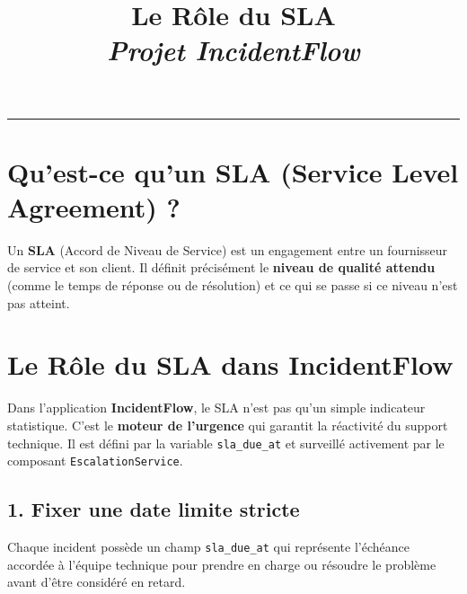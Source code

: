 \documentclass[12pt,a4paper]{article}
\title{\textbf{\Huge Le Rôle du SLA}\\ \large \vspace{0.5cm} \textit{Projet IncidentFlow}}
\author{}
\date{}
\begin{document}
\maketitle
\vspace{-1.5cm}
\hrule
\vspace{1cm}

\section*{Qu'est-ce qu'un SLA (Service Level Agreement) ?}
Un \textbf{SLA} (Accord de Niveau de Service) est un engagement entre un fournisseur de service et son client. Il définit précisément le \textbf{niveau de qualité attendu} (comme le temps de réponse ou de résolution) et ce qui se passe si ce niveau n'est pas atteint.

\vspace{0.5cm}
\noindent{}

\vspace{1cm}

\section*{Le Rôle du SLA dans IncidentFlow}
Dans l'application \textbf{IncidentFlow}, le SLA n'est pas qu'un simple indicateur statistique. C'est le \textbf{moteur de l'urgence} qui garantit la réactivité du support technique. Il est défini par la variable \texttt{sla\_due\_at} et surveillé activement par le composant \texttt{EscalationService}.

\subsection*{1. Fixer une date limite stricte}
Chaque incident possède un champ \texttt{sla\_due\_at} qui représente l'échéance accordée à l'équipe technique pour prendre en charge ou résoudre le problème avant d'être considéré en retard.
\end{document}
